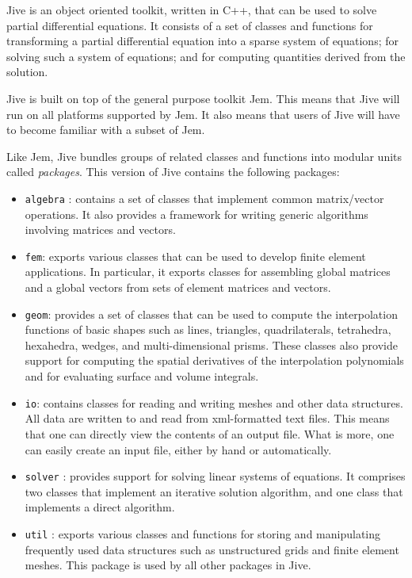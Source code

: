 \documentclass[a4paper,12pt,english]{habanera-shortmanual}
\newcommand{\Code}[1]{\texttt{#1}}
\begin{document}
\noindent
Jive is an object oriented toolkit, written in C++, that can be used
to solve partial differential equations. It consists of a set of
classes and functions for transforming a partial differential equation
into a sparse system of equations; for solving such a system of
equations; and for computing quantities derived from the solution.

Jive is built on top of the general purpose toolkit Jem. This means
that Jive will run on all platforms supported by Jem. It also means
that users of Jive will have to become familiar with a subset of Jem.

\BlankLine
Like Jem, Jive bundles groups of related classes and functions into
modular units called \emph{packages}. This version of Jive contains
the following packages:
\begin{itemize}

\item \Code{algebra} : contains a set of classes that implement common
  matrix/vector operations. It also provides a framework for writing
  generic algorithms involving matrices and vectors.

\item \Code{fem}: exports various classes that can be used to develop
  finite element applications. In particular, it exports classes for
  assembling global matrices and a global vectors from sets of element
  matrices and vectors.

\item \Code{geom}: provides a set of classes that can be used to
  compute the interpolation functions of basic shapes such as lines,
  triangles, quadrilaterals, tetrahedra, hexahedra, wedges, and
  multi-dimensional prisms. These classes also provide support for
  computing the spatial derivatives of the interpolation polynomials
  and for evaluating surface and volume integrals.

\item \Code{io}: contains classes for reading and writing meshes and
  other data structures. All data are written to and read from
  xml-formatted text files. This means that one can directly view the
  contents of an output file. What is more, one can easily create an
  input file, either by hand or automatically.

\item \Code{solver} : provides support for solving linear systems of
  equations. It comprises two classes that implement an iterative
  solution algorithm, and one class that implements a direct
  algorithm.

\item \Code{util} : exports various classes and functions for storing
  and manipulating frequently used data structures such as
  unstructured grids and finite element meshes. This package is used
  by all other packages in Jive.

\end{itemize}
\end{document}
